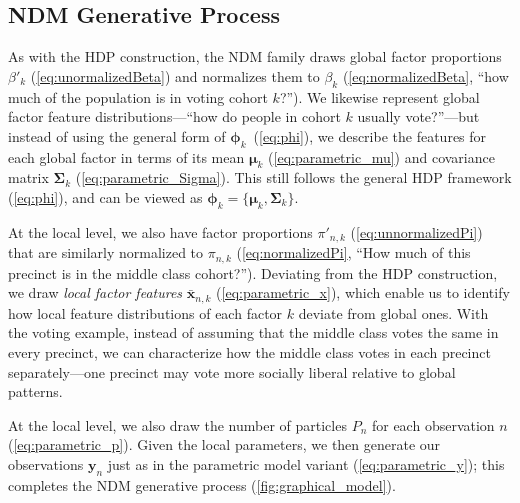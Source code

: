 \documentclass[twoside,11pt]{article}
\begin{document}
\subsection{NDM Generative Process}
\label{sec:generativeProcess}
As with the HDP construction, the NDM family draws global factor proportions $\beta'_k$ (\cref{eq:unormalizedBeta}) and normalizes them to $\beta_k$ (\cref{eq:normalizedBeta}, ``how much of the population is in voting cohort $k$?'').  
We likewise represent global factor feature distributions---``how do people in cohort $k$ usually vote?''---but instead of using the general form of $\boldsymbol{\phi}_k$~(\cref{eq:phi}), we describe the features for each global factor in terms of its mean $\boldsymbol{\mu}_k$ (\cref{eq:parametric_mu}) and covariance matrix $\boldsymbol{\Sigma}_k$ (\cref{eq:parametric_Sigma}).  This still follows the general HDP framework (\cref{eq:phi}), and can be viewed as $\boldsymbol{\phi}_k=\{\boldsymbol{\mu}_k, \boldsymbol{\Sigma}_k\}$.

At the local level, we also have factor proportions $\pi'_{n,k}$ (\cref{eq:unnormalizedPi}) that are similarly normalized to $\pi_{n,k}$ (\cref{eq:normalizedPi}, ``How much of this precinct is in the middle class cohort?'').  Deviating from the HDP construction, we draw \emph{local factor features} $\boldsymbol{\bar{x}}_{n,k}$ (\cref{eq:parametric_x}), which enable us to identify how local feature distributions of each factor $k$ deviate from global ones.  With the voting example, instead of assuming that the middle class votes the same in every precinct, we can characterize how the middle class votes in each precinct separately---one precinct may vote more socially liberal relative to global patterns.

At the local level, we also draw the number of particles $P_n$ for each observation $n$ (\cref{eq:parametric_p}).
Given the local parameters, we then generate our observations $\boldsymbol{y}_n$ just as in the parametric model variant (\cref{eq:parametric_y}); this completes the NDM generative process (\cref{fig:graphical_model}).
\end{document}
